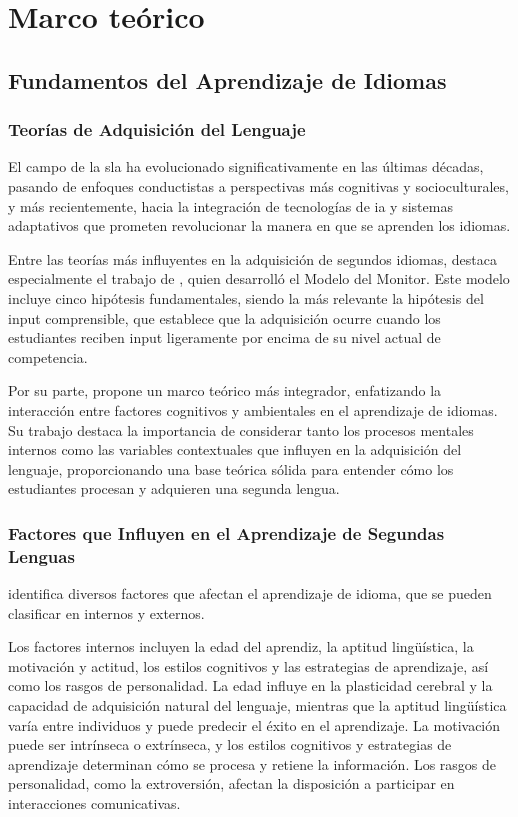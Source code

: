 \chapter{Marco teórico}
\label{marco-teorico}



\section{Fundamentos del Aprendizaje de Idiomas}

\subsection{Teorías de Adquisición del Lenguaje}

El campo de la \gls{sla} ha evolucionado significativamente en las últimas décadas, pasando de enfoques conductistas a perspectivas más cognitivas y socioculturales, y más recientemente, hacia la integración de tecnologías de \gls{ia} y sistemas adaptativos que prometen revolucionar la manera en que se aprenden los idiomas.

Entre las teorías más influyentes en la adquisición de segundos idiomas, destaca especialmente el trabajo de \cite{krashen1982principles}, quien desarrolló el Modelo del Monitor. Este modelo incluye cinco hipótesis fundamentales, siendo la más relevante la hipótesis del input comprensible, que establece que la adquisición ocurre cuando los estudiantes reciben input ligeramente por encima de su nivel actual de competencia.

Por su parte, \cite{ellis1994study} propone un marco teórico más integrador, enfatizando la interacción entre factores cognitivos y ambientales en el aprendizaje de idiomas. Su trabajo destaca la importancia de considerar tanto los procesos mentales internos como las variables contextuales que influyen en la adquisición del lenguaje, proporcionando una base teórica sólida para entender cómo los estudiantes procesan y adquieren una segunda lengua.

\subsection{Factores que Influyen en el Aprendizaje de Segundas Lenguas}

\cite{ellis1994study} identifica diversos factores que afectan el aprendizaje de idioma, que se pueden clasificar en internos y externos.

Los factores internos incluyen la edad del aprendiz, la aptitud lingüística, la motivación y actitud, los estilos cognitivos y las estrategias de aprendizaje, así como los rasgos de personalidad. La edad influye en la plasticidad cerebral y la capacidad de adquisición natural del lenguaje, mientras que la aptitud lingüística varía entre individuos y puede predecir el éxito en el aprendizaje. La motivación puede ser intrínseca o extrínseca, y los estilos cognitivos y estrategias de aprendizaje determinan cómo se procesa y retiene la información. Los rasgos de personalidad, como la extroversión, afectan la disposición a participar en interacciones comunicativas.

